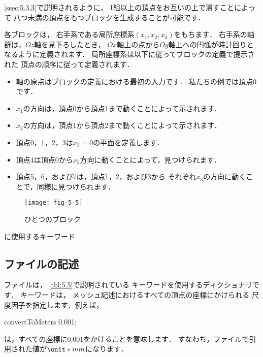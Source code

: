 \autoref{ssec:5.3.3}で説明されるように，
1組以上の頂点をお互いの上で潰すことによって
八つ未満の頂点をもつブロックを生成することが可能です．

各ブロックは，
右手系である局所座標系$(x_{1}, x_{2}, x_{3})$をもちます．
右手系の軸群は，$Oz$軸を見下ろしたとき，
$Ox$軸上の点から$Oy$軸上への円弧が時計回りとなるように定義されます．
局所座標系は以下に従ってブロックの定義で提示された
頂点の順序に従って定義されます．
\begin{itemize}
 \label{p:U-130}
 \item 軸の原点はブロックの定義における最初の入力です．
       私たちの例では頂点0です．
 \item $x_{1}$の方向は，頂点0から頂点1まで動くことによって示されます．
 \item $x_{2}$の方向は，頂点1から頂点2まで動くことによって示されます．
 \item 頂点0，1，2，3は$x_{3} = 0$の平面を定義します．
 \item 頂点4は頂点0から$x_{3}$方向に動くことによって，見つけられます．
 \item 頂点5，6，および7は，頂点1，2，および3から
       それぞれ$x_{3}$の方向に動くことで，同様に見つけられます．
\end{itemize}


\begin{figure}[ht]
 \texttt{[image: fig-5-5]}
 \caption{ひとつのブロック}
 \label{fig:5.5}
\end{figure}


\begin{table}[ht]
 
 \caption{に使用するキーワード}
 \label{tbl:5.5}
\end{table}


\subsection{ファイルの記述}
\label{ssec:5.3.1}
ファイルは，
\autoref{tbl:5.5}で説明されている
キーワードを使用するディクショナリです．
%
%
キーワードは，
メッシュ記述におけるすべての頂点の座標にかけられる
尺度因子を指定します．例えば，
\begin{OFverbatim}[file]
convertToMeters 0.001;
\end{OFverbatim}
は，すべての座標に$0.001$をかけることを意味します．
すなわち，ファイルで引用された値が$\unit*{mm}$になります．

